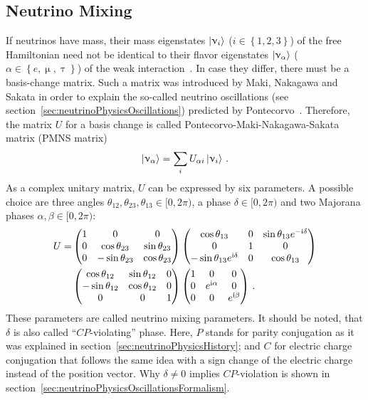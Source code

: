 \subsection{Neutrino Mixing}
\label{sec:neutrinoPhysicsMassMechanismsMixing}
If neutrinos have mass, their mass eigenstates $\left|\upnu_i\right\rangle$ ($i \in \left\{1, 2, 3\right\}$) of the free Hamiltonian need not be identical to their flavor eigenstates $\left|\upnu_\alpha\right\rangle$ ($\alpha \in \left\{e,\upmu,\uptau\right\}$) of the weak interaction~\cite{zuber2011neutrino}. In case they differ, there must be a basis-change matrix. Such a matrix was introduced by Maki, Nakagawa and Sakata in order to explain the so-called neutrino oscillations (see section~\ref{sec:neutrinoPhysicsOscillations}) predicted by Pontecorvo~\cite{Pontecorvo1957, Maki1962}. Therefore, the matrix $U$ for a basis change is called Pontecorvo-Maki-Nakagawa-Sakata matrix (PMNS matrix)
\begin{equation}
\left|\upnu_\alpha\right\rangle = \sum_{i} U_{\alpha i} \left|\upnu_i\right\rangle
\text{\,.}
\end{equation}
As a complex unitary matrix, $U$ can be expressed by six parameters. A possible choice are three angles $\theta_{12}, \theta_{23}, \theta_{13} \in [0,2\pi)$, a phase $\delta \in [0,2\pi)$ and two Majorana phases $\alpha, \beta \in [0,2\pi)$:
\begin{align}
\label{eq:PMNSmatrix}
U =  
&\begin{pmatrix} 
1 & 0 & 0 \\ 
0 & \cos\theta_{23} & \sin\theta_{23} \\ 
0 & -\sin\theta_{23} & \cos\theta_{23} 
\end{pmatrix}
\begin{pmatrix} 
\cos\theta_{13} & 0 & \sin\theta_{13}e^{-\mathrm{i}\delta} \\ 
0 & 1 & 0 \\ 
-\sin\theta_{13}e^{\mathrm{i}\delta} & 0 & \cos\theta_{13} 
\end{pmatrix} \\ \notag
&\begin{pmatrix} 
\cos\theta_{12} & \sin\theta_{12} & 0 \\ 
-\sin\theta_{12} & \cos\theta_{12} & 0 \\ 
0 & 0 & 1 
\end{pmatrix}
\begin{pmatrix} 
1 & 0 & 0 \\ 
0 & e^{\mathrm{i}\alpha} & 0 \\ 
0 & 0 & e^{\mathrm{i}\beta} 
\end{pmatrix}
\text{\,.}
\end{align}
These parameters are called neutrino mixing parameters. It should be noted, that $\delta$ is also called ``$CP$-violating'' phase. Here, $P$ stands for parity conjugation as it was explained in section~\ref{sec:neutrinoPhysicsHistory}; and $C$ for electric charge conjugation that follows the same idea with a sign change of the electric charge instead of the position vector. Why $\delta \neq 0$ implies $CP$-violation is shown in section~\ref{sec:neutrinoPhysicsOscillationsFormalism}.


